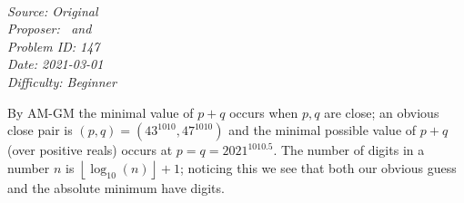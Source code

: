 \SSbreak\\
\emph{Source: Original}\\
\emph{Proposer: \Ptan\, and \Pwen}\\
\emph{Problem ID: 147}\\
\emph{Date: 2021-03-01}\\
\emph{Difficulty: Beginner}\\
\SSbreak

\bigskip

\begin{solution}\hfil\medskip
  
By AM-GM the minimal value of $p + q$ occurs when $p, q$ are close; an obvious close pair is $(p, q) = \left(43^{1010}, 47^{1010}\right)$
and the minimal possible value of $p + q$ (over positive reals) occurs at $p = q = 2021^{1010.5}$. The number of digits in a number $n$
is $\left\lfloor \log_{10}(n) \right\rfloor + 1$; noticing this we see that both our obvious guess and the absolute minimum have  digits.
\end{solution}\bigskip
